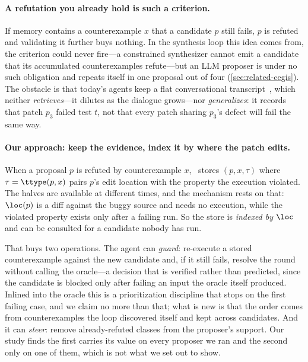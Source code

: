 \paragraph{A refutation you already hold is such a criterion.}
If memory contains a counterexample $x$ that a candidate $p$ still fails, $p$
is refuted and validating it further buys nothing. In the synthesis loop this
idea comes from, the criterion could never fire---a constrained synthesizer
cannot emit a candidate that its accumulated counterexamples refute---but an
LLM proposer is under no such obligation and repeats itself in one proposal out
of four (\cref{sec:related-cegis}). The obstacle is that today's agents keep a
flat conversational transcript~\cite{xia2024chatrepair,shinn2023reflexion,%
chen2024selfdebug}, which neither \emph{retrieves}---it dilutes as the dialogue
grows---nor \emph{generalizes}: it records that patch $p_3$ failed test $t$,
not that every patch sharing $p_3$'s defect will fail the same way.

\paragraph{Our approach: keep the evidence, index it by where the patch edits.}
When a proposal $p$ is refuted by counterexample $x$, \CEGMem\ stores
$(p, x, \tau)$ where $\tau = \ttype(p,x)$ pairs $p$'s edit location with the
property the execution violated. The halves are available at different times,
and the mechanism rests on that: $\loc(p)$ is a diff against the buggy source
and needs no execution, while the violated property exists only after a failing
run. So the store is
\emph{indexed by $\loc$} and can be consulted for a candidate nobody has run.

That buys two operations. The agent can \emph{guard}: re-execute a stored
counterexample against the new candidate and, if it still fails, resolve the
round without calling the oracle---a decision that is verified rather than
predicted, since the candidate is blocked only after failing an input the
oracle itself produced. Inlined into
the oracle this is a prioritization discipline that stops on the first failing
case, and we claim no more than that; what is new is that the order comes from
counterexamples the loop discovered itself and kept across candidates. And it
can \emph{steer}: remove already-refuted classes from the proposer's support.
Our study finds the first carries its value on every proposer we ran and the
second only on one of them, which is not what we set out to show.

